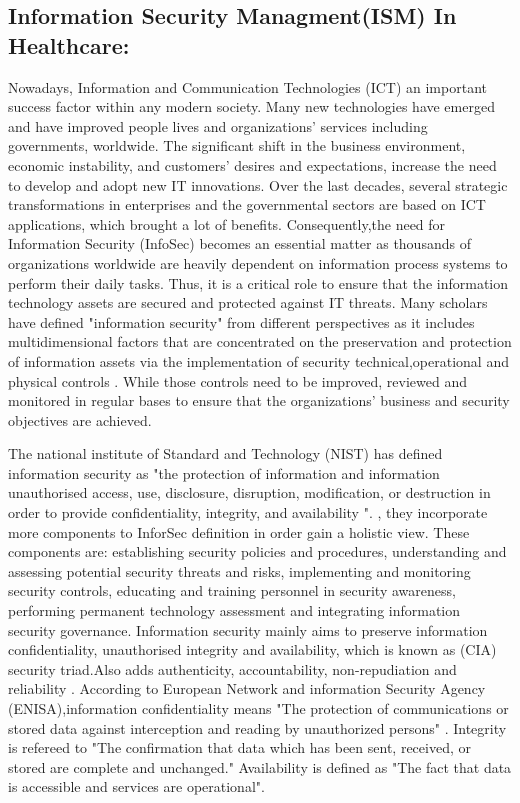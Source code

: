\subsection{Information Security Managment(ISM) In Healthcare:}
Nowadays, Information and Communication Technologies (ICT) an important success factor within any modern society. Many new technologies have emerged and have improved people lives and organizations’ services including governments, worldwide. The significant shift in the business environment, economic instability, and customers’ desires and expectations, increase the need to develop and adopt new IT innovations. Over the last decades, several strategic transformations in enterprises and the governmental sectors are based on ICT applications, which brought a lot of benefits. Consequently,the need for Information Security (InfoSec) becomes an essential matter as thousands of organizations worldwide are heavily dependent on information process systems to perform their daily tasks. Thus, it is a critical role to ensure that the information technology assets are secured and protected against IT threats.
Many scholars have defined "information security" from different perspectives as it includes multidimensional factors that are concentrated on the preservation and protection of information assets via the implementation of security technical,operational and physical controls \cite{Hamid2014,Posthumus2004}. While those controls  need to be improved, reviewed and monitored in regular bases to ensure that the organizations' business and security objectives are achieved\cite{ISO/IEC2014}.


The national institute of Standard and Technology (NIST)\cite{Kissel2013} has defined information security as "the protection of information and information unauthorised access, use, disclosure, disruption, modification, or destruction in order to provide confidentiality, integrity, and availability ". \citet{Zafar2009}, they incorporate more components to InforSec definition in order gain a holistic view. These components are: establishing security policies and procedures, understanding and assessing potential security threats and risks, implementing and monitoring security controls, educating and training personnel in security awareness, performing permanent technology assessment and integrating information security governance. Information security mainly aims to preserve information confidentiality, unauthorised integrity and availability, which is known as (CIA) security triad\cite{pfleeger2007security}.Also \cite{ISO/IEC2014} adds authenticity, accountability, non-repudiation and reliability . According to European Network and information Security Agency (ENISA)\cite{ENISA2006},information confidentiality means "The protection of communications or stored data against interception and reading by unauthorized persons" . Integrity is refereed to "The confirmation that data which has been sent, received, or stored are complete and unchanged." Availability is defined as "The fact that data is accessible and services are operational". 



